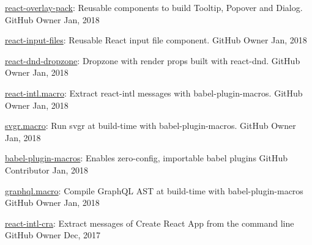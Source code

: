 \begin{cvhonors}
  \cvhonor
    {\href{https://github.com/evenchange4/react-overlay-pack}{react-overlay-pack}: \textmd{Reusable components to build Tooltip, Popover and Dialog.}} %
    {GitHub} %
    {Owner} %
    {Jan, 2018} %

  \cvhonor
    {\href{https://github.com/evenchange4/react-input-files}{react-input-files}: \textmd{Reusable React input file component.}} %
    {GitHub} %
    {Owner} %
    {Jan, 2018} %

  \cvhonor
    {\href{https://github.com/evenchange4/react-dnd-dropzone}{react-dnd-dropzone}: \textmd{Dropzone with render props built with react-dnd.}} %
    {GitHub} %
    {Owner} %
    {Jan, 2018} %

  \cvhonor
    {\href{https://github.com/evenchange4/react-intl.macro}{react-intl.macro}: \textmd{Extract react-intl messages with babel-plugin-macros.}} %
    {GitHub} %
    {Owner} %
    {Jan, 2018} %

  \cvhonor
    {\href{https://github.com/evenchange4/svgr.macro}{svgr.macro}: \textmd{Run svgr at build-time with babel-plugin-macros.}} %
    {GitHub} %
    {Owner} %
    {Jan, 2018} %

  \cvhonor
    {\href{https://github.com/kentcdodds/babel-plugin-macros}{babel-plugin-macros}: \textmd{Enables zero-config, importable babel plugins}} %
    {GitHub} %
    {Contributor} %
    {Jan, 2018} %

  \cvhonor
    {\href{https://github.com/evenchange4/graphql.macro}{graphql.macro}: \textmd{Compile GraphQL AST at build-time with babel-plugin-macros}}
    {GitHub} %
    {Owner} %
    {Jan, 2018} %

  \cvhonor
    {\href{https://github.com/evenchange4/react-intl-cra}{react-intl-cra}: \textmd{Extract messages of Create React App from the command line}}
    {GitHub} %
    {Owner} %
    {Dec, 2017} %


\end{cvhonors}
